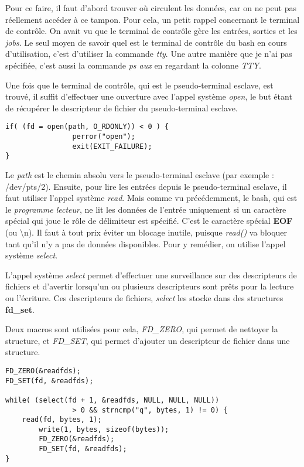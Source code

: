 Pour ce faire, il faut d'abord trouver où circulent les données, car on ne peut pas réellement accéder à ce tampon. Pour cela, un petit rappel concernant le terminal de contrôle. On avait vu que le terminal de contrôle gère les entrées, sorties et les \textit{jobs}. Le seul moyen de savoir quel est le terminal de contrôle du bash en cours d'utilisation, c'est d'utiliser la commande \textit{tty}. Une autre manière que je n'ai pas spécifiée, c'est aussi la commande \textit{ps aux} en regardant la colonne \textit{TTY}.

Une fois que le terminal de contrôle, qui est le pseudo-terminal esclave, est trouvé, il suffit d'effectuer une ouverture avec l'appel système \textit{open}, le but étant de récupérer le descripteur de fichier du pseudo-terminal esclave.

\begin{verbatim}
if( (fd = open(path, O_RDONLY)) < 0 ) {
                perror("open");
                exit(EXIT_FAILURE);
}
\end{verbatim}

Le \textit{path} est le chemin absolu vers le pseudo-terminal esclave (par exemple : /dev/pts/2). Ensuite, pour lire les entrées depuis le pseudo-terminal esclave, il faut utiliser l'appel système \textit{read}. Mais comme vu précédemment, le bash, qui est le \textit{programme lecteur}, ne lit les données de l'entrée uniquement si un caractère spécial qui joue le rôle de délimiteur est spécifié. C'est le caractère spécial \textbf{EOF} (ou \textbackslash n). Il faut à tout prix éviter un blocage inutile, puisque \textit{read()} va bloquer tant qu'il n'y a pas de données disponibles. Pour y remédier, on utilise l'appel système \textit{select}.

L'appel système \textit{select} permet d'effectuer une surveillance sur des descripteurs de fichiers et d'avertir lorsqu'un ou plusieurs descripteurs sont prêts pour la lecture ou l'écriture. Ces descripteurs de fichiers, \textit{select} les stocke dans des structures \textbf{fd\_set}.

Deux macros sont utilisées pour cela, \textit{FD\_ZERO}, qui permet de nettoyer la structure, et \textit{FD\_SET}, qui permet d'ajouter un descripteur de fichier dans une structure.

\newpage

\begin{verbatim}
FD_ZERO(&readfds);
FD_SET(fd, &readfds);

while( (select(fd + 1, &readfds, NULL, NULL, NULL)) 
				> 0 && strncmp("q", bytes, 1) != 0) {
	read(fd, bytes, 1);
        write(1, bytes, sizeof(bytes));
        FD_ZERO(&readfds);
        FD_SET(fd, &readfds);
}
\end{verbatim}

